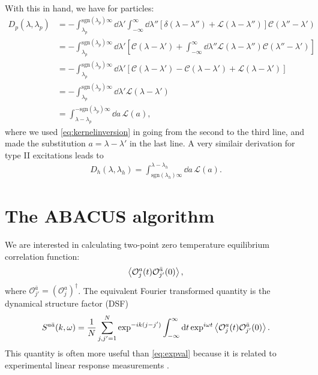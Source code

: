 \documentclass[11pt, a4paper]{report} %
\newcommand{\inversetruncc}{\mathcal{L}}
\newcommand{\kernel}{\mathcal{C}}
\newcommand{\operator}{\mathcal{O}}
\begin{document}
With this in hand, we have for particles:
\begin{align}
	D_p(\lambda, \lambda_p) &= - \int_{\lambda_p}^{\textrm{sgn}(\lambda_p)\infty} \dd \lambda' \int_{-\infty}^{\infty} \dd  \lambda'' \left[\delta(\lambda-\lambda'') + \inversetruncc(\lambda-\lambda'') \right]\kernel(\lambda''-\lambda')\\
	&= - \int_{\lambda_p}^{\textrm{sgn}(\lambda_p)\infty} \dd \lambda' \left[\kernel(\lambda-\lambda') + \int_{-\infty}^{\infty} \dd  \lambda'' \inversetruncc(\lambda-\lambda'') \kernel(\lambda''-\lambda')\right]\\
	&= - \int_{\lambda_p}^{\textrm{sgn}(\lambda_p)\infty} \dd \lambda' \left[\kernel(\lambda-\lambda') - \kernel(\lambda-\lambda') + \inversetruncc(\lambda-\lambda')\right]\\
	&= - \int_{\lambda_p}^{\textrm{sgn}(\lambda_p)\infty} \dd \lambda' \inversetruncc(\lambda-\lambda')\\
	&=  \int_{\lambda-\lambda_p}^{-\textrm{sgn}(\lambda_p)\infty} \dd a \, \inversetruncc(a),
\end{align}
where we used \cref{eq:kernelinversion} in going from the second to the third line, and made the substitution \(a = \lambda-\lambda'\) in the last line.
A very similair derivation for type II excitations leads to
\begin{align}
	D_h(\lambda,\lambda_h) = \int_{\textrm{sgn}(\lambda_h)\infty}^{\lambda-\lambda_h} \dd a\, \inversetruncc(a).
\end{align}




\chapter{The ABACUS algorithm}\label{chap:abacus}

We are interested in calculating two-point zero temperature equilibrium correlation function:
\begin{equation}\label{eq:expval}
	\expval{\operator_j^a(t)\operator_{j'}^{\bar{a}}(0)},
\end{equation}
where \(\operator_{j'}^{\bar{a}} = (\operator_j^a)^{\dagger}\).
The equivalent Fourier transformed quantity is the dynamical structure factor (DSF)
\begin{equation}
	S^{a\bar{a}}(k,\omega) = \frac{1}{N} \sum_{j,j'=1}^{N} \exp^{-ik(j-j')} \int_{-\infty}^{\infty}\dd t \exp^{i\omega t}\expval{\operator_j^a(t)\operator_{j'}^{\bar{a}}(0)}.
\end{equation}
This quantity is often more useful than \cref{eq:expval} because it is related to experimental linear response measurements \cite{Caux2009}.
\end{document}
